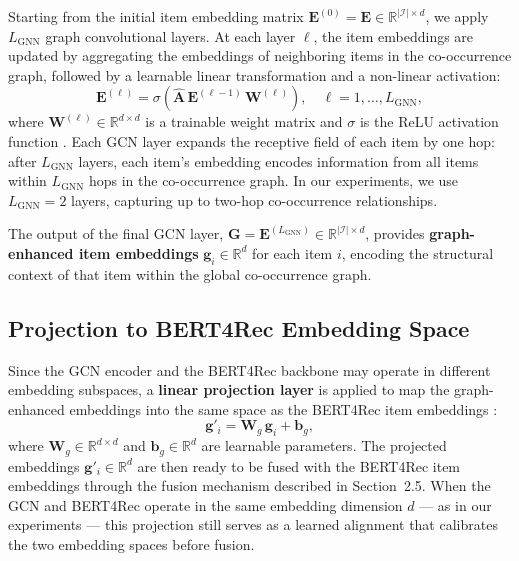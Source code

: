\documentclass[12pt,a4paper]{report}
\newcommand{\parencite}[1]{\citep{#1}}
\begin{document}
Starting from the initial item embedding matrix
$\mathbf{E}^{(0)} = \mathbf{E} \in \mathbb{R}^{|\mathcal{I}| \times d}$,
we apply $L_{\text{GNN}}$ graph convolutional layers. At each
layer $\ell$, the item embeddings are updated by aggregating
the embeddings of neighboring items in the co-occurrence graph,
followed by a learnable linear transformation and a non-linear
activation:
\begin{equation}
  \mathbf{E}^{(\ell)} = \sigma\!\left(
    \hat{\mathbf{A}}\, \mathbf{E}^{(\ell-1)}\, \mathbf{W}^{(\ell)}
  \right), \quad \ell = 1, \ldots, L_{\text{GNN}},
\end{equation}
where $\mathbf{W}^{(\ell)} \in \mathbb{R}^{d \times d}$ is a
trainable weight matrix and $\sigma$ is the ReLU activation
function \parencite{ouledmeriem2025hybrid}. Each GCN layer
expands the receptive field of each item by one hop: after
$L_{\text{GNN}}$ layers, each item's embedding encodes
information from all items within $L_{\text{GNN}}$ hops in
the co-occurrence graph. In our experiments, we use
$L_{\text{GNN}} = 2$ layers, capturing up to two-hop
co-occurrence relationships.

The output of the final GCN layer,
$\mathbf{G} = \mathbf{E}^{(L_{\text{GNN}})} \in
\mathbb{R}^{|\mathcal{I}| \times d}$, provides
\textbf{graph-enhanced item embeddings}
$\mathbf{g}_i \in \mathbb{R}^d$ for each item $i$, encoding
the structural context of that item within the global
co-occurrence graph.

\subsection{Projection to BERT4Rec Embedding Space}

Since the GCN encoder and the BERT4Rec backbone may operate in
different embedding subspaces, a \textbf{linear projection layer}
is applied to map the graph-enhanced embeddings into the same
space as the BERT4Rec item embeddings
\parencite{ouledmeriem2025hybrid}:
\begin{equation}
  \mathbf{g}'_i = \mathbf{W}_g\, \mathbf{g}_i + \mathbf{b}_g,
\end{equation}
where $\mathbf{W}_g \in \mathbb{R}^{d \times d}$ and
$\mathbf{b}_g \in \mathbb{R}^d$ are learnable parameters. The
projected embeddings $\mathbf{g}'_i \in \mathbb{R}^d$ are then
ready to be fused with the BERT4Rec item embeddings through the
fusion mechanism described in Section~2.5. When the GCN and
BERT4Rec operate in the same embedding dimension $d$ --- as in
our experiments --- this projection still serves as a learned
alignment that calibrates the two embedding spaces before fusion.
\end{document}
